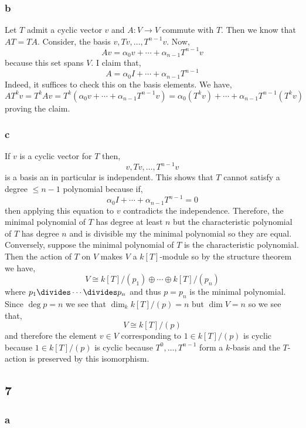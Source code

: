 \documentclass[12pt]{article}
\begin{document}
\subsubsection{b}

Let $T$ admit a cyclic vector $v$ and $A : V \to V$ commute with $T$. Then we know that $AT = TA$. Consider, the basis $v, Tv, \dots, T^{n-1} v$. Now,
\[ A v = \alpha_0 v + \cdots + \alpha_{n-1} T^{n-1} v \]
because this set spans $V$. I claim that,
\[ A = \alpha_0 I + \cdots + \alpha_{n-1} T^{n-1} \]
Indeed, it suffices to check this on the basis elements. We have,
\[ A T^k v = T^k A v = T^k (\alpha_0 v + \cdots + \alpha_{n-1} T^{n-1} v) = \alpha_0 (T^k v) + \cdots + \alpha_{n-1} T^{n-1} (T^k v) \]
proving the claim. 

\subsubsection{c}

If $v$ is a cyclic vector for $T$ then,
\[ v, Tv, \dots, T^{n-1} v \]
is a basis an in particular is independent. This shows that $T$ cannot satisfy a degree $\le n-1$ polynomial because if,
\[ \alpha_0 I + \cdots + \alpha_{n-1} T^{n-1} = 0 \]
then applying this equation to $v$ contradicts the independence. Therefore, the minimal polynomial of $T$ has degree at least $n$ but the characteristic polynomial of $T$ has degree $n$ and is divisible my the minimal polynomial so they are equal.
\bigskip\\
Conversely, suppose the minimal polynomial of $T$ is the characteristic polynomial. Then the action of $T$ on $V$ makes $V$ a $k[T]$-module so by the structure theorem we have,
\[ V \cong k[T]/(p_1) \oplus \cdots \oplus k[T]/(p_n) \]
where $p_1 \divides \cdots \divides p_n$ and thus $p = p_n$ is the minimal polynomial. Since $\deg{p} = n$ we see that $\dim_k k[T]/(p) = n$ but $\dim{V} = n$ so we see that,
\[ V \cong k[T]/(p) \]
and therefore the element $v \in V$ corresponding to $1 \in k[T]/(p)$ is cyclic because $1 \in k[T]/(p)$ is cyclic because $T^0, \dots, T^{n-1}$ form a $k$-basis and the $T$-action is preserved by this isomorphism.

\subsection{7}

\subsubsection{a}
\end{document}
